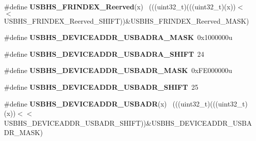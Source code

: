 \begin{DoxyCompactItemize}
\item 
\hypertarget{group___u_s_b_h_s___register___masks_gaa10617054bd86b9da75eb0405e027d47}{}\#define {\bfseries U\+S\+B\+H\+S\+\_\+\+F\+R\+I\+N\+D\+E\+X\+\_\+\+Reerved}(x)                              ~(((uint32\+\_\+t)(((uint32\+\_\+t)(x))$<$$<$U\+S\+B\+H\+S\+\_\+\+F\+R\+I\+N\+D\+E\+X\+\_\+\+Reerved\+\_\+\+S\+H\+I\+F\+T))\&U\+S\+B\+H\+S\+\_\+\+F\+R\+I\+N\+D\+E\+X\+\_\+\+Reerved\+\_\+\+M\+A\+S\+K)\label{group___u_s_b_h_s___register___masks_gaa10617054bd86b9da75eb0405e027d47}

\item 
\hypertarget{group___u_s_b_h_s___register___masks_gaa04c7f8a54fa5f985e7d1a94e0bcd3d1}{}\#define {\bfseries U\+S\+B\+H\+S\+\_\+\+D\+E\+V\+I\+C\+E\+A\+D\+D\+R\+\_\+\+U\+S\+B\+A\+D\+R\+A\+\_\+\+M\+A\+S\+K}~0x1000000u\label{group___u_s_b_h_s___register___masks_gaa04c7f8a54fa5f985e7d1a94e0bcd3d1}

\item 
\hypertarget{group___u_s_b_h_s___register___masks_ga83c4d5b213ea3c5ea161a9253f7ced71}{}\#define {\bfseries U\+S\+B\+H\+S\+\_\+\+D\+E\+V\+I\+C\+E\+A\+D\+D\+R\+\_\+\+U\+S\+B\+A\+D\+R\+A\+\_\+\+S\+H\+I\+F\+T}~24\label{group___u_s_b_h_s___register___masks_ga83c4d5b213ea3c5ea161a9253f7ced71}

\item 
\hypertarget{group___u_s_b_h_s___register___masks_ga2e537cb02a90c3b2b6047f6aa5c2a75b}{}\#define {\bfseries U\+S\+B\+H\+S\+\_\+\+D\+E\+V\+I\+C\+E\+A\+D\+D\+R\+\_\+\+U\+S\+B\+A\+D\+R\+\_\+\+M\+A\+S\+K}~0x\+F\+E000000u\label{group___u_s_b_h_s___register___masks_ga2e537cb02a90c3b2b6047f6aa5c2a75b}

\item 
\hypertarget{group___u_s_b_h_s___register___masks_ga9192186983f7d61072d44fa232f429d8}{}\#define {\bfseries U\+S\+B\+H\+S\+\_\+\+D\+E\+V\+I\+C\+E\+A\+D\+D\+R\+\_\+\+U\+S\+B\+A\+D\+R\+\_\+\+S\+H\+I\+F\+T}~25\label{group___u_s_b_h_s___register___masks_ga9192186983f7d61072d44fa232f429d8}

\item 
\hypertarget{group___u_s_b_h_s___register___masks_ga82f6d7a2b9565b4edf46927d600de7dc}{}\#define {\bfseries U\+S\+B\+H\+S\+\_\+\+D\+E\+V\+I\+C\+E\+A\+D\+D\+R\+\_\+\+U\+S\+B\+A\+D\+R}(x)                          ~(((uint32\+\_\+t)(((uint32\+\_\+t)(x))$<$$<$U\+S\+B\+H\+S\+\_\+\+D\+E\+V\+I\+C\+E\+A\+D\+D\+R\+\_\+\+U\+S\+B\+A\+D\+R\+\_\+\+S\+H\+I\+F\+T))\&U\+S\+B\+H\+S\+\_\+\+D\+E\+V\+I\+C\+E\+A\+D\+D\+R\+\_\+\+U\+S\+B\+A\+D\+R\+\_\+\+M\+A\+S\+K)\label{group___u_s_b_h_s___register___masks_ga82f6d7a2b9565b4edf46927d600de7dc}


\end{DoxyCompactItemize}

